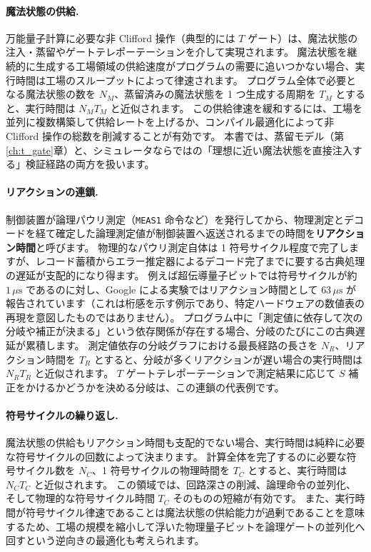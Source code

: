 \paragraph{魔法状態の供給.}
万能量子計算に必要な非 Clifford 操作（典型的には $T$ ゲート）は、魔法状態の注入・蒸留やゲートテレポーテーションを介して実現されます。
魔法状態を継続的に生成する工場領域の供給速度がプログラムの需要に追いつかない場合、実行時間は工場のスループットによって律速されます。
プログラム全体で必要となる魔法状態の数を $N_M$、蒸留済みの魔法状態を 1 つ生成する周期を $T_M$ とすると、実行時間は $N_M T_M$ と近似されます。
この供給律速を緩和するには、工場を並列に複数構築して供給レートを上げるか、コンパイル最適化によって非 Clifford 操作の総数を削減することが有効です。
本書では、蒸留モデル（第\ref{ch:t_gate}章）と、シミュレータならではの「理想に近い魔法状態を直接注入する」検証経路の両方を扱います。

\paragraph{リアクションの連鎖.}
制御装置が論理パウリ測定（\texttt{MEAS1} 命令など）を発行してから、物理測定とデコードを経て確定した論理測定値が制御装置へ返送されるまでの時間を\textbf{リアクション時間}と呼びます。
物理的なパウリ測定自体は 1 符号サイクル程度で完了しますが、レコード蓄積からエラー推定器によるデコード完了までに要する古典処理の遅延が支配的になり得ます。
例えば超伝導量子ビットでは符号サイクルが約 $1\,\mu\mathrm{s}$ であるのに対し、Google による実験\cite{google2025belowthreshold}ではリアクション時間として $63\,\mu\mathrm{s}$ が報告されています（これは桁感を示す例示であり、特定ハードウェアの数値表の再現を意図したものではありません）。
プログラム中に「測定値に依存して次の分岐や補正が決まる」という依存関係が存在する場合、分岐のたびにこの古典遅延が累積します。
測定値依存の分岐グラフにおける最長経路の長さを $N_R$、リアクション時間を $T_R$ とすると、分岐が多くリアクションが遅い場合の実行時間は $N_R T_R$ と近似されます。
$T$ ゲートテレポーテーションで測定結果に応じて $S$ 補正をかけるかどうかを決める分岐は、この連鎖の代表例です。

\paragraph{符号サイクルの繰り返し.}
魔法状態の供給もリアクション時間も支配的でない場合、実行時間は純粋に必要な符号サイクルの回数によって決まります。
計算全体を完了するのに必要な符号サイクル数を $N_C$、1 符号サイクルの物理時間を $T_C$ とすると、実行時間は $N_C T_C$ と近似されます。
この領域では、回路深さの削減、論理命令の並列化、そして物理的な符号サイクル時間 $T_C$ そのものの短縮が有効です。
また、実行時間が符号サイクル律速であることは魔法状態の供給能力が過剰であることを意味するため、工場の規模を縮小して浮いた物理量子ビットを論理ゲートの並列化へ回すという逆向きの最適化も考えられます。

